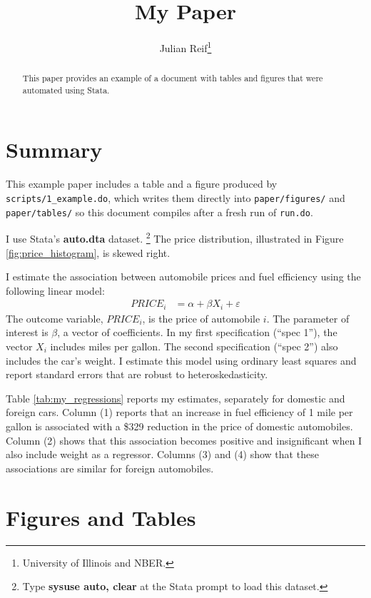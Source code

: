 \documentclass[12pt]{article}
\begin{document}
\title{My Paper}
\author{Julian Reif\thanks{University of Illinois and NBER.}}
\maketitle

\begin{abstract}
\noindent 
This paper provides an example of a document with tables and figures that were automated using Stata.
\end{abstract}

\clearpage

\section{Summary}

This example paper includes a table and a figure produced by \texttt{scripts/1\_example.do}, which writes them directly into \texttt{paper/figures/} and \texttt{paper/tables/} so this document compiles after a fresh run of \texttt{run.do}.

I use Stata's \textbf{auto.dta} dataset.%
%
\footnote{Type \textbf{sysuse auto, clear} at the Stata prompt to load this dataset.}
%
The price distribution, illustrated in Figure \ref{fig:price_histogram}, is skewed right.

I estimate the association between automobile prices and fuel efficiency using the following linear model:
\begin{align}
PRICE_i&=\alpha + \beta X_i + \varepsilon \label{eqn:model}
\end{align}
The outcome variable, $PRICE_i$, is the price of automobile $i$. The parameter of interest is $\beta$, a vector of coefficients. In my first specification (``spec 1''), the vector $X_i$ includes miles per gallon. The second specification (``spec 2'') also includes the car's weight. I estimate this model using ordinary least squares and report standard errors that are robust to heteroskedasticity.

Table \ref{tab:my_regressions} reports my estimates, separately for domestic and foreign cars. Column (1) reports that an increase in fuel efficiency of 1 mile per gallon is associated with a \$329 reduction in the price of domestic automobiles. Column (2) shows that this association becomes positive and insignificant when I also include weight as a regressor. Columns (3) and (4) show that these associations are similar for foreign automobiles.

\clearpage
\section{Figures and Tables}
\end{document}

